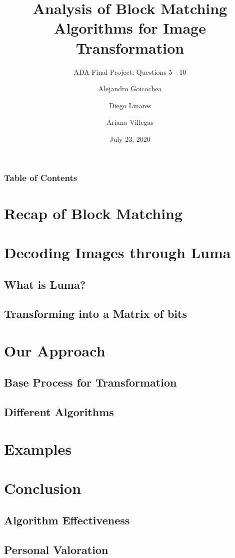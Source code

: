 \documentclass{beamer}
\title{Analysis of Block Matching Algorithms for Image Transformation}
\subtitle{ADA Final Project: Questions 5 - 10}
\author{Alejandro Goicochea\and Diego Linares\and Ariana Villegas}
\institute{\inst{}Universidad de Ingeniería y Tecnología}
\date{July 23, 2020}
\begin{document}
  \frame{\titlepage}
  \begin{frame}
    \frametitle{Table of Contents}
    \tableofcontents
  \end{frame}
  \section{Recap of Block Matching}
  \section{Decoding Images through Luma}
    \subsection{What is Luma?}
    \subsection{Transforming into a Matrix of bits}
  \section{Our Approach}
    \subsection{Base Process for Transformation}
    \subsection{Different Algorithms}
  \section{Examples}
  \section{Conclusion}
    \subsection{Algorithm Effectiveness}
    \subsection{Personal Valoration}
\end{document}
